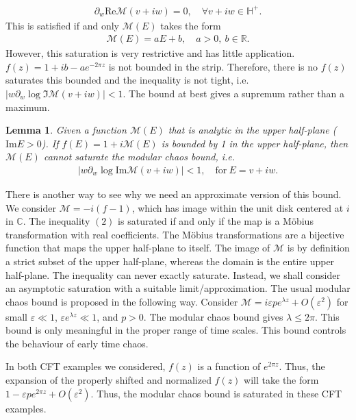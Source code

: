 \documentclass[a4paper,11pt]{article}
\newtheorem{lemma}[theorem]{Lemma}
\theoremstyle{definition}
\newcommand{\mM}{\mathcal{M}}
\newcommand{\p}{\partial}
\begin{document}
\begin{eqnarray}
    \p_w \text{Re} \mM(v+iw)=0, \quad \forall v+iw\in \mathbb{H}^+ .
\end{eqnarray}
This is satisfied if and only $\mM(E)$ takes the form
\begin{eqnarray}
    \mM(E)=a E+b, \quad a>0,\ b\in\mathbb{R}.
\end{eqnarray}
However, this saturation is very restrictive and has little application. $f(z) = 1+ib - a e^{-2\pi z}$ is not bounded in the strip. Therefore, there is no $f(z)$ saturates this bounded and the inequality is not tight, i.e. $|w\p_w \log \Im \mM(v+iw)| < 1$. The bound at best gives a supremum rather than a maximum.
\begin{lemma}
    Given a function $\mM(E)$ that is analytic in the upper half-plane ($\text{Im} E > 0$). If $f(E) = 1+i\mM(E)$ is bounded by 1 in the upper half-plane, then $\mM(E)$ cannot saturate the modular chaos bound, i.e.
    \begin{align}
        |w\p_w \log \text{Im} \mM(v+iw)| < 1, \quad \text{for}\ E=v+iw.
    \end{align}
\end{lemma}
There is another way to see why we need an approximate version of this bound. We consider $\mM = -i(f-1)$, which has image within the unit disk centered at $i$ in $\mathbb{C}$. The inequality $(2)$ is saturated if and only if the map is a M\"obius transformation with real coefficients. The M\"obius transformations are a bijective function that maps the upper half-plane to itself. The image of $\mM$ is by definition a strict subset of the upper half-plane, whereas the domain is the entire upper half-plane. The inequality can never exactly saturate. Instead, we shall consider an asymptotic saturation with a suitable limit/approximation. The usual modular chaos bound is proposed in the following way\cite{}. Consider $\mM = i\varepsilon p e^{\lambda z} + O(\varepsilon^2)$ for small $\varepsilon \ll 1$, $\varepsilon e^{\lambda z} \ll 1$, and $p>0$. The modular chaos bound gives $\lambda \leq 2\pi$. This bound is only meaningful in the proper range of time scales. This bound controls the behaviour of early time chaos. 

In both CFT examples we considered, $f(z)$ is a function of $e^{2\pi z}$. Thus, the expansion of the properly shifted and normalized $f(z)$ will take the form $1-\varepsilon p e^{2 \pi z} + O(\varepsilon^2)$. Thus, the modular chaos bound is saturated in these CFT examples.
\end{document}
